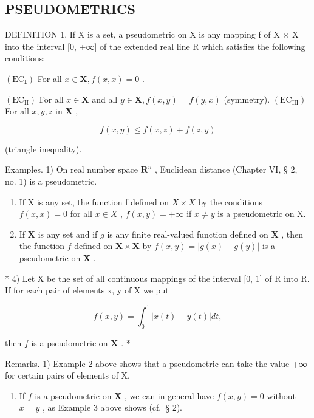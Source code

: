 \subsection{PSEUDOMETRICS}

DEFINITION 1. If X is a set, a pseudometric on X is any mapping f of X × X into the interval {[}0, +∞{]} of the extended real line R which satisfies the following conditions:

\((\mathrm{EC}_{\mathbf{I}})\) For all \(x \in \mathbf{X}, f(x, x) = 0\) .

\((\mathrm{EC}_{\mathrm{II}})\) For all \(x \in \mathbf{X}\) and all \(y \in \mathbf{X}, f(x, y) = f(y, x)\) (symmetry). \((\mathrm{EC}_{\mathrm{III}})\) For all \(x, y, z\) in \(\mathbf{X}\) ,

\[
f (x, y) \leqslant f (x, z) + f (z, y)
\]

(triangle inequality).

Examples. 1) On real number space \(\mathbf{R}^n\) , Euclidean distance (Chapter VI, § 2, no. 1) is a pseudometric.

\begin{enumerate}
\def\labelenumi{\arabic{enumi})}
\setcounter{enumi}{1}
\item
  If X is any set, the function f defined on \(X \times X\) by the conditions \(f(x, x) = 0\) for all \(x \in X\) , \(f(x, y) = +\infty\) if \(x \neq y\) is a pseudometric on X.
\item
  If \(\mathbf{X}\) is any set and if \(g\) is any finite real-valued function defined on \(\mathbf{X}\) , then the function \(f\) defined on \(\mathbf{X} \times \mathbf{X}\) by \(f(x, y) = |g(x) - g(y)|\) is a pseudometric on \(\mathbf{X}\) .
\end{enumerate}

* 4) Let X be the set of all continuous mappings of the interval {[}0, 1{]} of R into R. If for each pair of elements x, y of X we put

\[
f (x, y) = \int_ {0} ^ {1} | x (t) - y (t) | d t,
\]

then \(f\) is a pseudometric on \(\mathbf{X}\) . *

Remarks. 1) Example 2 above shows that a pseudometric can take the value +∞ for certain pairs of elements of X.

\begin{enumerate}
\def\labelenumi{\arabic{enumi})}
\setcounter{enumi}{1}
\tightlist
\item
  If \(f\) is a pseudometric on \(\mathbf{X}\) , we can in general have \(f(x, y) = 0\) without \(x = y\) , as Example 3 above shows (cf.~§ 2).
\end{enumerate}

